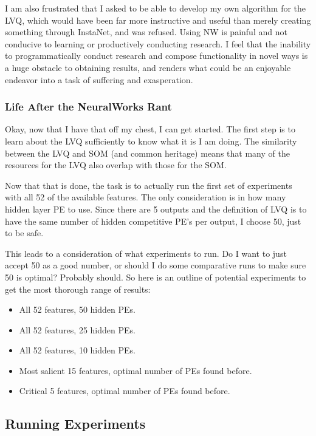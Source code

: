 \documentclass[12pt]{article}
\begin{document}
I am also frustrated that I asked to be able to develop my own algorithm for the LVQ, which would have been far more instructive and useful than merely creating something through InstaNet, and was refused.  Using NW is painful and not conducive to learning or productively conducting research.  I feel that the inability to programmatically conduct research and compose functionality in novel ways is a huge obstacle to obtaining results, and renders what could be an enjoyable endeavor into a task of suffering and exasperation.  

\subsubsection{Life After the NeuralWorks Rant}

Okay, now that I have that off my chest, I can get started.  The first step is to learn about the LVQ sufficiently to know what it is I am doing.  The similarity between the LVQ and SOM (and common heritage) means that many of the resources for the LVQ also overlap with those for the SOM.  

Now that that is done, the task is to actually run the first set of experiments with all 52 of the available features.  The only consideration is in how many hidden layer PE to use.  Since there are 5 outputs and the definition of LVQ is to have the same number of hidden competitive PE's per output, I choose 50, just to be safe.  

This leads to a consideration of what experiments to run.  Do I want to just accept 50 as a good number, or should I do some comparative runs to make sure 50 is optimal?  Probably should.  So here is an outline of potential experiments to get the most thorough range of results:

\begin{itemize}

\item All 52 features, 50 hidden PEs.
\item All 52 features, 25 hidden PEs.
\item All 52 features, 10 hidden PEs.
\item Most salient 15 features, optimal number of PEs found before.
\item Critical 5 features, optimal number of PEs found before.

\end{itemize}

\subsection{Running Experiments}
\end{document}
